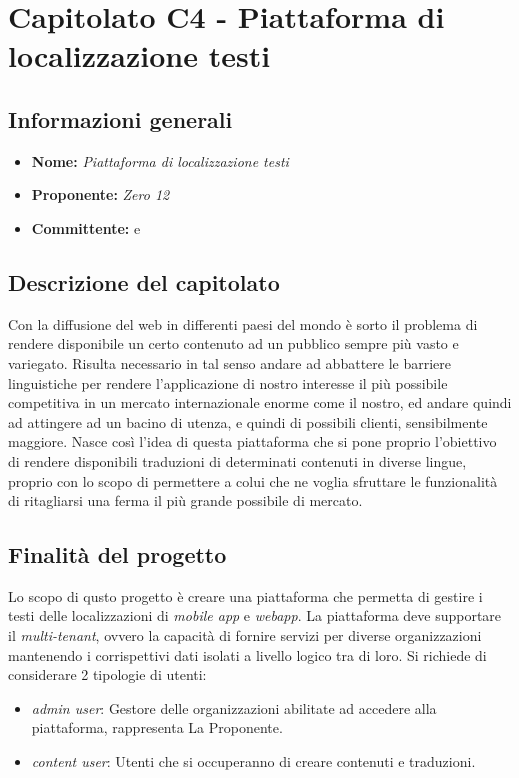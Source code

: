 \section{Capitolato C4 - Piattaforma di localizzazione testi}\label{section:c4}

\subsection{Informazioni generali}
\begin{itemize}
    \item \textbf{Nome:} \textit{Piattaforma di localizzazione testi}
    \item \textbf{Proponente:} \textit{Zero 12}
    \item \textbf{Committente:} \commitNameM{} e \commitNameS{}
\end{itemize}

\subsection{Descrizione del capitolato}
Con la diffusione del web in differenti paesi del mondo è sorto il problema di rendere disponibile un
certo contenuto ad un pubblico sempre più vasto e variegato.
Risulta necessario in tal senso andare ad abbattere le barriere linguistiche per rendere l’applicazione
di nostro interesse il più possibile competitiva in un mercato internazionale enorme come il nostro, ed andare quindi ad attingere ad un bacino di utenza, e quindi di possibili clienti, sensibilmente maggiore.\newline
Nasce così l’idea di questa piattaforma che si pone proprio l'obiettivo di rendere disponibili traduzioni di determinati contenuti in diverse lingue, proprio con lo scopo di permettere a colui che ne voglia sfruttare le funzionalità di ritagliarsi una ferma il più grande possibile di mercato.

\subsection{Finalità del progetto}
Lo scopo di qusto progetto è creare una piattaforma che permetta di gestire i testi delle localizzazioni di \textit{mobile app} e \textit{webapp}.
La piattaforma deve supportare il \textit{multi-tenant}, ovvero la capacità di fornire servizi per diverse organizzazioni mantenendo i corrispettivi dati isolati a livello logico tra di loro.\newline
Si richiede di considerare 2 tipologie di utenti:
\begin{itemize}
    \item \textit{admin user}: Gestore delle organizzazioni abilitate ad accedere alla piattaforma, rappresenta La Proponente.
    \item \textit{content user}: Utenti che si occuperanno di creare contenuti e traduzioni.
\end{itemize}

